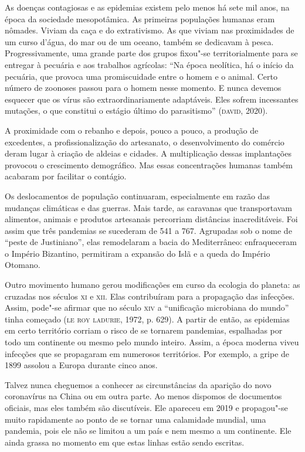 As doenças contagiosas e as epidemias existem pelo menos há sete mil
anos, na época da sociedade mesopotâmica. As primeiras populações
humanas eram nômades. Viviam da caça e do extrativismo. As que viviam
nas proximidades de um curso d'água, do mar ou de um oceano, também se
dedicavam à pesca. Progressivamente, uma grande parte dos grupos
fixou"-se territorialmente para se entregar à pecuária e aos trabalhos
agrícolas: ``Na época neolítica, há o início da pecuária, que provoca
uma promiscuidade entre o homem e o animal. Certo número de zoonoses
passou para o homem nesse momento. E nunca devemos esquecer que os vírus
são extraordinariamente adaptáveis. Eles sofrem incessantes mutações, o
que constitui o estágio último do parasitismo'' (\textsc{david}, 2020).

A proximidade com o rebanho e depois, pouco a pouco, a produção de
excedentes, a profissionalização do artesanato, o desenvolvimento do
comércio deram lugar à criação de aldeias e cidades. A multiplicação
dessas implantações provocou o crescimento demográfico. Mas essas
concentrações humanas também acabaram por facilitar o contágio.

Os deslocamentos de população continuaram, especialmente em razão das
mudanças climáticas e das guerras. Mais tarde, as caravanas que
transportavam alimentos, animais e produtos artesanais percorriam
distâncias inacreditáveis. Foi assim que três pandemias se sucederam de
541 a 767. Agrupadas sob o nome de ``peste de Justiniano'', elas
remodelaram a bacia do Mediterrâneo: enfraqueceram o Império Bizantino,
permitiram a expansão do Islã e a queda do Império Otomano.

Outro movimento humano gerou modificações em curso da ecologia do
planeta: as cruzadas nos séculos \textsc{xi} e \textsc{xii}. Elas contribuíram para a
propagação das infecções. Assim, pode"-se afirmar que no século \textsc{xiv} a
``unificação microbiana do mundo'' tinha começado (\textsc{le roy ladurie}, 1972,
p. 629). A partir de então, as epidemias em certo território corriam o
risco de se tornarem pandemias, espalhadas por todo um continente ou
mesmo pelo mundo inteiro. Assim, a época moderna viveu infecções que se
propagaram em numerosos territórios. Por exemplo, a gripe de 1899
assolou a Europa durante cinco anos.

Talvez nunca cheguemos a conhecer as circunstâncias da aparição do novo
coronavírus na China ou em outra parte. Ao menos dispomos de documentos
oficiais, mas eles também são discutíveis. Ele apareceu em 2019 e
propagou"-se muito rapidamente ao ponto de se tornar uma calamidade
mundial, uma pandemia, pois ele não se limitou a um país e nem mesmo a
um continente. Ele ainda grassa no momento em que estas linhas estão
sendo escritas.

